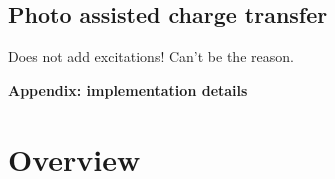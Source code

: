 \documentclass[a4paper,twocolumn]{revtex4-1} %
\begin{document}
\subsection{Photo assisted charge transfer}
Does not add excitations! Can't be the reason.















\renewcommand{\theequation}{S\arabic{equation}}
\setcounter{equation}{0}
\renewcommand{\thefigure}{S\arabic{figure}}
\setcounter{figure}{0}
\setcounter{section}{0}

\clearpage

\onecolumngrid
\begin{center}
\textbf{\large Appendix: implementation details}

\vspace{0.4cm}


\end{center}
\vspace{\columnsep}



\section{Overview}
\end{document}
